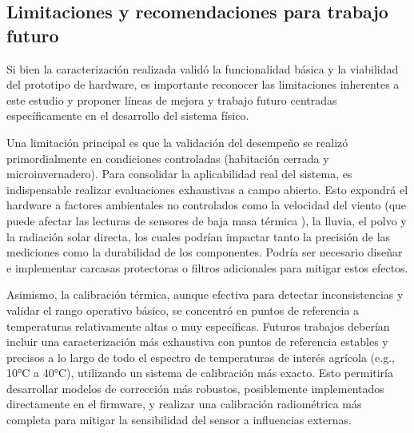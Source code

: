 \subsection{Limitaciones y recomendaciones para trabajo futuro}
\label{subsec:hardware_limitaciones_futuro}
Si bien la caracterización realizada validó la funcionalidad básica y la viabilidad del prototipo de hardware, es importante reconocer las limitaciones inherentes a este estudio y proponer líneas de mejora y trabajo futuro centradas específicamente en el desarrollo del sistema físico.

Una limitación principal es que la validación del desempeño se realizó primordialmente en condiciones controladas (habitación cerrada y microinvernadero). Para consolidar la aplicabilidad real del sistema, es indispensable realizar evaluaciones exhaustivas a campo abierto. Esto expondrá el hardware a factores ambientales no controlados como la velocidad del viento (que puede afectar las lecturas de sensores de baja masa térmica ), la lluvia, el polvo y la radiación solar directa, los cuales podrían impactar tanto la precisión de las mediciones como la durabilidad de los componentes. Podría ser necesario diseñar e implementar carcasas protectoras o filtros adicionales para mitigar estos efectos.

Asimismo, la calibración térmica, aunque efectiva para detectar inconsistencias y validar el rango operativo básico, se concentró en puntos de referencia a temperaturas relativamente altas o muy específicas. Futuros trabajos deberían incluir una caracterización más exhaustiva con puntos de referencia estables y precisos a lo largo de todo el espectro de temperaturas de interés agrícola (e.g., 10°C a 40°C), utilizando un sistema de calibración más exacto. Esto permitiría desarrollar modelos de corrección más robustos, posiblemente implementados directamente en el firmware, y realizar una calibración radiométrica más completa para mitigar la sensibilidad del sensor a influencias externas.

